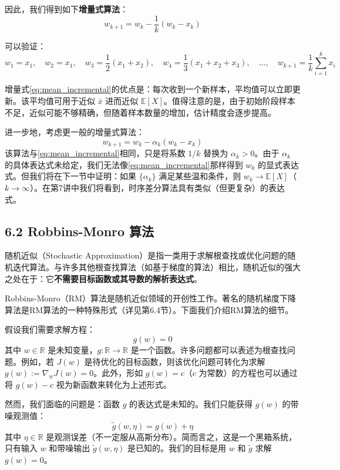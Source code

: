 \documentclass[UTF8]{article}
\begin{document}
因此，我们得到如下\textbf{增量式算法}：
\begin{equation}
\label{eq:mean_incremental}
w_{k+1} = w_k - \frac{1}{k}(w_k - x_k)
\end{equation}

可以验证：
\[
w_1 = x_1,\quad w_2 = x_1,\quad w_3 = \frac{1}{2}(x_1 + x_2),\quad w_4 = \frac{1}{3}(x_1 + x_2 + x_3),\quad \dots,\quad w_{k+1} = \frac{1}{k}\sum_{i=1}^{k} x_i
\]

增量式\eqref{eq:mean_incremental}的优点是：每次收到一个新样本，平均值可以立即更新。该平均值可用于近似 $\bar{x}$ 进而近似 $\mathbb{E}[X]$。值得注意的是，由于初始阶段样本不足，近似可能不够精确，但随着样本数量的增加，估计精度会逐步提高。

进一步地，考虑更一般的增量式算法：
\begin{equation}
\label{eq:mean_general}
w_{k+1} = w_k - \alpha_k(w_k - x_k)
\end{equation}
该算法与\eqref{eq:mean_incremental}相同，只是将系数 $1/k$ 替换为 $\alpha_k > 0$。由于 $\alpha_k$ 的具体表达式未给定，我们无法像\eqref{eq:mean_incremental}那样得到 $w_k$ 的显式表达式。但我们将在下一节中证明：如果 $\{\alpha_k\}$ 满足某些温和条件，则 $w_k \to \mathbb{E}[X]$（$k \to \infty$）。在第7讲中我们将看到，时序差分算法具有类似（但更复杂）的表达式。

\subsection*{6.2 Robbins-Monro 算法}

随机近似（Stochastic Approximation）是指一类用于求解根查找或优化问题的随机迭代算法。与许多其他根查找算法（如基于梯度的算法）相比，随机近似的强大之处在于：它\textbf{不需要目标函数或其导数的解析表达式}。

Robbins-Monro（RM）算法是随机近似领域的开创性工作。著名的随机梯度下降算法是RM算法的一种特殊形式（详见第6.4节）。下面我们介绍RM算法的细节。

假设我们需要求解方程：
\[
g(w) = 0
\]
其中 $w \in \mathbb{R}$ 是未知变量，$g: \mathbb{R} \to \mathbb{R}$ 是一个函数。许多问题都可以表述为根查找问题。例如，若 $J(w)$ 是待优化的目标函数，则该优化问题可转化为求解 $g(w) := \nabla_w J(w) = 0$。此外，形如 $g(w) = c$（$c$ 为常数）的方程也可以通过将 $g(w) - c$ 视为新函数来转化为上述形式。

然而，我们面临的问题是：函数 $g$ 的表达式是未知的。我们只能获得 $g(w)$ 的带噪观测值：
\[
\tilde{g}(w, \eta) = g(w) + \eta
\]
其中 $\eta \in \mathbb{R}$ 是观测误差（不一定服从高斯分布）。简而言之，这是一个黑箱系统，只有输入 $w$ 和带噪输出 $\tilde{g}(w, \eta)$ 是已知的。我们的目标是用 $w$ 和 $\tilde{g}$ 求解 $g(w) = 0$。
\end{document}
